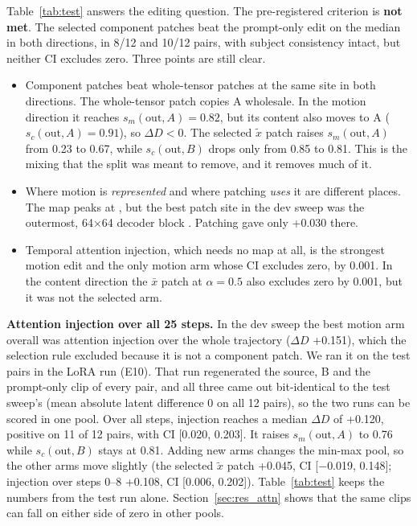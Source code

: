 \documentclass[twoside,english]{article}
\newcommand{\xs}{\bar{x}}         %
\newcommand{\xd}{\tilde{x}}       %
\newcommand{\dD}{\Delta D}
\begin{document}
Table~\ref{tab:test} answers the editing question. The pre-registered criterion is \textbf{not met}. The
selected component patches beat the prompt-only edit on the median in both directions, in 8/12 and 10/12
pairs, with subject consistency intact, but neither CI excludes zero. Three points are still clear.
\begin{itemize}
\item Component patches beat whole-tensor patches at the same site in both directions. The whole-tensor
  patch copies A wholesale. In the motion direction it reaches $s_m(\text{out},A) = 0.82$, but its content
  also moves to A ($s_c(\text{out},A) = 0.91$), so $\dD < 0$. The selected $\xd$ patch raises
  $s_m(\text{out},A)$ from 0.23 to 0.67, while $s_c(\text{out},B)$ drops only from 0.85 to 0.81. This is the
  mixing that the split was meant to remove, and it removes much of it.
\item Where motion is \emph{represented} and where patching \emph{uses} it are different places. The map
  peaks at , but the best patch site in the dev sweep was the outermost, 64$\times$64
  decoder block . Patching  gave only +0.030 there.
\item Temporal attention injection, which needs no map at all, is the strongest motion edit and the only
  motion arm whose CI excludes zero, by 0.001. In the content direction the $\xs$ patch at $\alpha = 0.5$
  also excludes zero by 0.001, but it was not the selected arm.
\end{itemize}

\textbf{Attention injection over all 25 steps.} In the dev sweep the best motion arm overall was attention
injection over the whole trajectory ($\dD$ +0.151), which the selection rule excluded because it is not a
component patch. We ran it on the test pairs in the LoRA run (E10). That run regenerated the source, B
and the prompt-only clip of every pair, and all three came out bit-identical to the test sweep's (mean
absolute latent difference 0 on all 12 pairs), so the two runs can be scored in one pool. Over all steps,
injection reaches a median $\dD$ of +0.120, positive on 11 of 12 pairs, with CI [0.020, 0.203]. It raises
$s_m(\text{out},A)$ to 0.76 while $s_c(\text{out},B)$ stays at 0.81. Adding new arms changes the min-max pool,
so the other arms move slightly (the selected $\xd$ patch +0.045, CI [$-$0.019, 0.148]; injection over
steps 0--8 +0.108, CI [0.006, 0.202]). Table~\ref{tab:test} keeps the numbers from the test run alone.
Section~\ref{sec:res_attn} shows that the same clips can fall on either side of zero in other pools.
\end{document}
